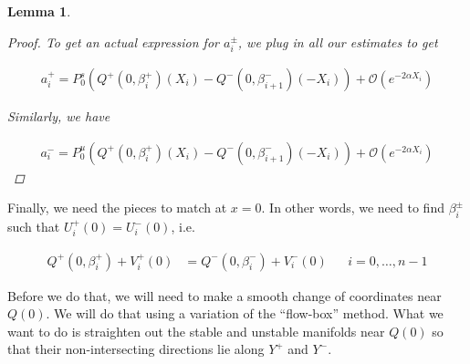 \documentclass[12pt]{article}
\newtheorem{lemma}{Lemma}
\begin{document}
\begin{lemma}
\begin{proof}
To get an actual expression for $a_i^\pm$, we plug in all our estimates to get

\begin{align*}
a_i^+ = P^s_0 \left( Q^+(0, \beta_i^+)(X_i) - Q^-(0, \beta_{i+1}^-)(-X_i) \right) 
+ \mathcal{O}( e^{-2 \alpha X_i} )
\end{align*}

Similarly, we have

\begin{align*}
a_i^- = P^u_0 \left( Q^+(0, \beta_i^+)(X_i) - Q^-(0, \beta_{i+1}^-)(-X_i) \right) 
+ \mathcal{O}( e^{-2 \alpha X_i} )
\end{align*}

\end{proof}
\end{lemma}

Finally, we need the pieces to match at $x = 0$. In other words, we need to find $\beta_i^\pm$ such that $U_i^+(0) = U_i^-(0)$, i.e. 

\begin{align*}
Q^+(0, \beta_i^+) + V_i^+(0) &= Q^-(0, \beta_i^-) + V_i^-(0) && i = 0, \dots, n-1
\end{align*}

Before we do that, we will need to make a smooth change of coordinates near $Q(0)$. We will do that using a variation of the ``flow-box'' method. What we want to do is straighten out the stable and unstable manifolds near $Q(0)$ so that their non-intersecting directions lie along $Y^+$ and $Y^-$.

\end{document}
